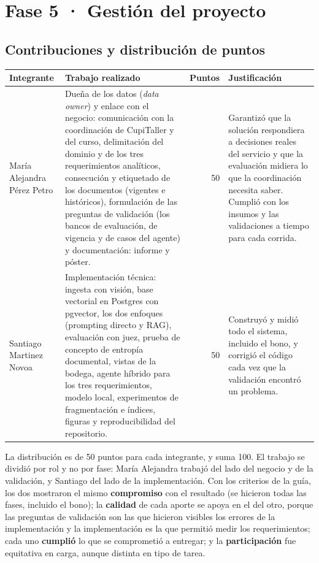 \documentclass[11pt,letterpaper]{article}
\begin{document}
\section{Fase 5 · Gestión del proyecto}

\subsection{Contribuciones y distribución de puntos}

\begin{table}[H]\small\renewcommand{\arraystretch}{1.15}
\begin{tabularx}{\textwidth}{>{\raggedright\arraybackslash}p{}LRL}
\toprule
\textbf{Integrante} & \textbf{Trabajo realizado} & \textbf{Puntos} & \textbf{Justificación} \\
\midrule
María Alejandra Pérez Petro & Dueña de los datos (\emph{data owner}) y enlace con el negocio: comunicación con la coordinación de CupiTaller y del curso, delimitación del dominio y de los tres requerimientos analíticos, consecución y etiquetado de los documentos (vigentes e históricos), formulación de las preguntas de validación (los bancos de evaluación, de vigencia y de casos del agente) y documentación: informe y póster. & 50 & Garantizó que la solución respondiera a decisiones reales del servicio y que la evaluación midiera lo que la coordinación necesita saber. Cumplió con los insumos y las validaciones a tiempo para cada corrida. \\
Santiago Martinez Novoa & Implementación técnica: ingesta con visión, base vectorial en Postgres con pgvector, los dos enfoques (prompting directo y RAG), evaluación con juez, prueba de concepto de entropía documental, vistas de la bodega, agente híbrido para los tres requerimientos, modelo local, experimentos de fragmentación e índices, figuras y reproducibilidad del repositorio. & 50 & Construyó y midió todo el sistema, incluido el bono, y corrigió el código cada vez que la validación encontró un problema. \\
\bottomrule
\end{tabularx}
\end{table}

La distribución es de 50 puntos para cada integrante, y suma 100. El trabajo se dividió por rol y no por fase: María Alejandra trabajó del lado del negocio y de la validación, y Santiago del lado de la implementación. Con los criterios de la guía, los dos mostraron el mismo \textbf{compromiso} con el resultado (se hicieron todas las fases, incluido el bono); la \textbf{calidad} de cada aporte se apoya en el del otro, porque las preguntas de validación son las que hicieron visibles los errores de la implementación y la implementación es la que permitió medir los requerimientos; cada uno \textbf{cumplió} lo que se comprometió a entregar; y la \textbf{participación} fue equitativa en carga, aunque distinta en tipo de tarea.
\end{document}
